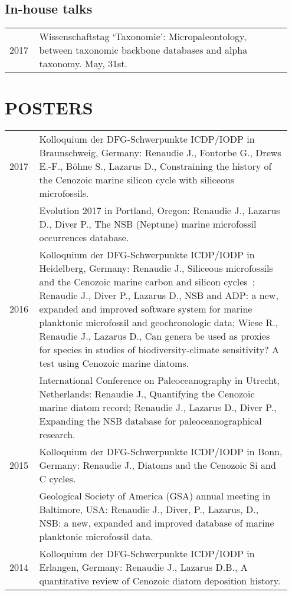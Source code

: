 \documentclass[11pt, a4paper]{article}
\begin{document}
\subsection{In-house talks}
\begin{longtable}{p{0.1\linewidth} P{0.85\linewidth}}
2017 & Wissenschaftstag `Taxonomie': Micropaleontology, between taxonomic backbone databases and alpha taxonomy. May, 31st.\\
\end{longtable}

\section{POSTERS}
\begin{longtable}{p{0.1\linewidth} P{0.85\linewidth}}
2017 & Kolloquium der DFG-Schwerpunkte ICDP/IODP in Braunschweig, Germany: Renaudie J., Fontorbe G., Drews E.-F., Böhne S., Lazarus D., Constraining the history of the Cenozoic marine silicon cycle with siliceous microfossils.\\
 & Evolution 2017 in Portland, Oregon: Renaudie J., Lazarus D., Diver P., The NSB (Neptune) marine microfossil occurrences database.\\
2016 & Kolloquium der DFG-Schwerpunkte ICDP/IODP in Heidelberg, Germany: Renaudie J., Siliceous microfossils and the Cenozoic marine carbon and silicon cycles ; Renaudie J., Diver P., Lazarus D., NSB and ADP: a new, expanded and improved software system for marine planktonic microfossil and geochronologic data; Wiese R., Renaudie J., Lazarus D., Can genera be used as proxies for species in studies of biodiversity-climate sensitivity? A test using Cenozoic marine diatoms.\\
 & International Conference on Paleoceanography in Utrecht, Netherlands: Renaudie J., Quantifying the Cenozoic marine diatom record; Renaudie J., Lazarus D., Diver P., Expanding the NSB database for paleoceanographical research.\\
2015 & Kolloquium der DFG-Schwerpunkte ICDP/IODP in Bonn, Germany: Renaudie J., Diatoms and the Cenozoic Si and C cycles.\\
 & Geological Society of America (GSA) annual meeting in Baltimore, USA: Renaudie J., Diver, P., Lazarus, D., NSB: a new, expanded and improved database of marine planktonic microfossil data.\\
2014 & Kolloquium der DFG-Schwerpunkte ICDP/IODP in Erlangen, Germany: Renaudie J., Lazarus D.B., A quantitative review of Cenozoic diatom deposition history.\\

\end{longtable}
\end{document}
